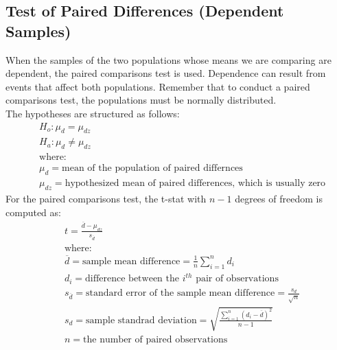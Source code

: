 \subsection{Test of Paired Differences (Dependent Samples)} %
\label{sub:Test of Paired Differences (Dependent Samples)}
When the samples of the two populations whose means we are comparing are dependent,
the paired comparisons test is used.
Dependence can result from events that affect both populations.
Remember that to conduct a paired comparisons test, the populations must be normally distributed.\\
The hypotheses are structured as follows:
\begin{align*}
	 & H_o: \mu_d = \mu_{dz}                                                            \\
	 & H_a: \mu_d \neq \mu_{dz}                                                         \\
	 & \text{where:}                                                                    \\
	 & \mu_d = \text{mean of the population of paired differnces}                       \\
	 & \mu_{dz} = \text{hypothesized mean of paired differences, which is usually zero}
\end{align*}
For the paired comparisons test, the t-stat with $n - 1$ degrees of freedom is computed as:
\begin{align*}
	 & t = \frac{\overline{d}-\mu_{dz}}{s_{\overline{d}}}                                             \\
	 & \text{where:}                                                                                  \\
	 & \overline{d} = \text{sample mean difference} = \frac{1}{n}\sum_{i=1}^{n}d_i                    \\
	 & d_i = \text{difference between the $i^{th}$ pair of observations}                              \\
	 & s_{\overline{d}} = \text{standard error of the sample mean difference} = \frac{s_d}{\sqrt{n}}  \\
	 & s_d = \text{sample standrad deviation} = \sqrt{\frac{\displaystyle \sum_{i=1}^{n}(d_i-\overline{d})^2}{n-1}} \\
	 & n = \text{the number of paired observations}
\end{align*}

